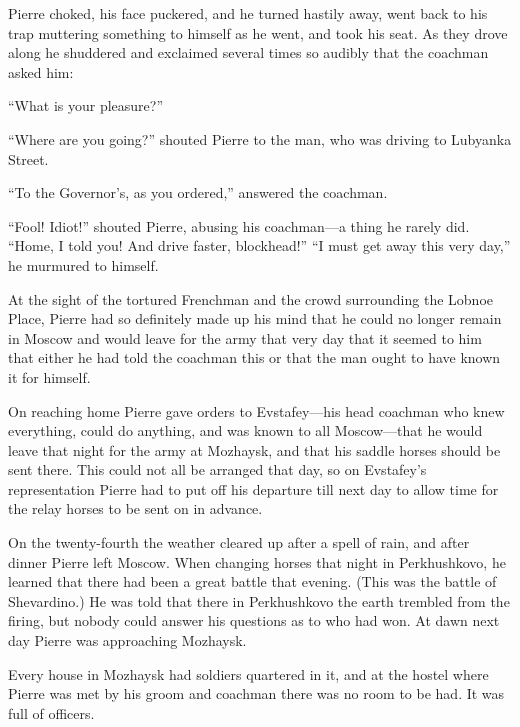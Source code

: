 Pierre choked, his face puckered, and he turned hastily away,
went back to his trap muttering something to himself as he went,
and took his seat. As they drove along he shuddered and exclaimed
several times so audibly that the coachman asked him:

``What is your pleasure?''

``Where are you going?'' shouted Pierre to the man, who was
driving to Lubyanka Street.

``To the Governor's, as you ordered,'' answered the coachman.

``Fool! Idiot!'' shouted Pierre, abusing his coachman---a thing
he rarely did. ``Home, I told you! And drive faster, blockhead!''
``I must get away this very day,'' he murmured to himself.

At the sight of the tortured Frenchman and the crowd surrounding
the Lobnoe Place, Pierre had so definitely made up his mind that
he could no longer remain in Moscow and would leave for the army
that very day that it seemed to him that either he had told the
coachman this or that the man ought to have known it for himself.

On reaching home Pierre gave orders to Evstafey---his head
coachman who knew everything, could do anything, and was known to
all Moscow---that he would leave that night for the army at
Mozhaysk, and that his saddle horses should be sent there. This
could not all be arranged that day, so on Evstafey's
representation Pierre had to put off his departure till next day
to allow time for the relay horses to be sent on in advance.

On the twenty-fourth the weather cleared up after a spell of
rain, and after dinner Pierre left Moscow. When changing horses
that night in Perkhushkovo, he learned that there had been a
great battle that evening. (This was the battle of Shevardino.)
He was told that there in Perkhushkovo the earth trembled from
the firing, but nobody could answer his questions as to who had
won. At dawn next day Pierre was approaching Mozhaysk.

Every house in Mozhaysk had soldiers quartered in it, and at the
hostel where Pierre was met by his groom and coachman there was
no room to be had. It was full of officers.

